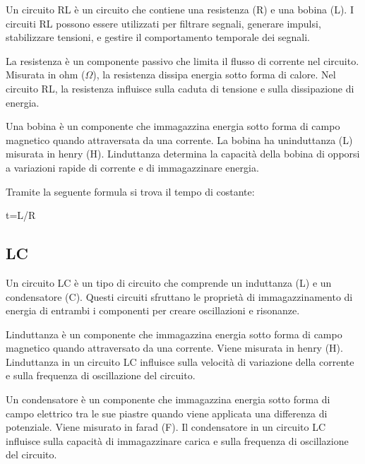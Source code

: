 \documentclass[
]{article}
\begin{document}
{Un circuito RL è un circuito che contiene una resistenza (R) e una
bobina (L). I circuiti RL possono essere utilizzati per filtrare
segnali, generare impulsi, stabilizzare tensioni, e gestire il
comportamento temporale dei segnali.}

{}

{La resistenza è un componente passivo che limita il flusso di corrente
nel circuito. Misurata in ohm ($\Omega$), la resistenza dissipa energia sotto
forma di calore. Nel circuito RL, la resistenza influisce sulla caduta
di tensione e sulla dissipazione di energia.}

{}

{Una bobina è un componente che immagazzina energia sotto forma di campo
magnetico quando attraversata da una corrente. La bobina ha
un\textquotesingle induttanza (L) misurata in henry (H).
L\textquotesingle induttanza determina la capacità della bobina di
opporsi a variazioni rapide di corrente e di immagazzinare energia.}

{}

{}

{Tramite la seguente formula si trova il tempo di costante:}

{t=L/R}

{}

{}

\subsection{\texorpdfstring{{LC}}{LC}}\label{h.nstmyfwqsvh8}

{Un circuito LC è un tipo di circuito che comprende un induttanza (L) e
un condensatore (C). Questi circuiti sfruttano le proprietà di
immagazzinamento di energia di entrambi i componenti per creare
oscillazioni e risonanze.}

{}

{L\textquotesingle induttanza è un componente che immagazzina energia
sotto forma di campo magnetico quando attraversato da una corrente.
Viene misurata in henry (H). L\textquotesingle induttanza in un circuito
LC influisce sulla velocità di variazione della corrente e sulla
frequenza di oscillazione del circuito.}

{}

{Un condensatore è un componente che immagazzina energia sotto forma di
campo elettrico tra le sue piastre quando viene applicata una differenza
di potenziale. Viene misurato in farad (F). Il condensatore in un
circuito LC influisce sulla capacità di immagazzinare carica e sulla
frequenza di oscillazione del circuito.}
\end{document}
